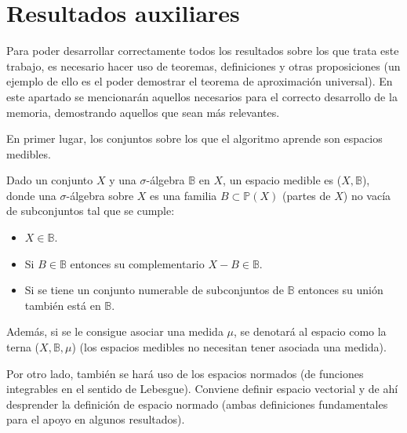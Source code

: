 
\newpage

\section{Resultados auxiliares}

Para poder desarrollar correctamente todos los resultados sobre los que trata este trabajo, es necesario hacer uso de teoremas, definiciones y otras proposiciones (un ejemplo de ello es el poder demostrar el teorema de aproximación universal). En este apartado se mencionarán aquellos necesarios para el correcto desarrollo de la memoria, demostrando aquellos que sean más relevantes.

En primer lugar, los conjuntos sobre los que el algoritmo aprende son espacios medibles.

\begin{definicion}
Dado un conjunto $X$ y una $\sigma$-álgebra $\mathbb{B}$ en $X$, un espacio medible es ($X,\mathbb{B}$), donde una $\sigma$-álgebra sobre $X$ es una familia $B \subset \mathbb{P}(X)$ (partes de $X$) no vacía de subconjuntos tal que se cumple:
\begin{itemize}
	\item $X \in \mathbb{B}$.
	\item Si $B\in\mathbb{B} $ entonces su complementario $X-B \in \mathbb{B}$.
	\item Si se tiene un conjunto numerable de subconjuntos de $\mathbb{B}$ entonces su unión también está en $\mathbb{B}$.
\end{itemize}
Además, si se le consigue asociar una medida $\mu$, se denotará al espacio como la terna ($X,\mathbb{B},\mu$) (los espacios medibles no necesitan tener asociada una medida).
\end{definicion}

Por otro lado, también se hará uso de los espacios normados (de funciones integrables en el sentido de Lebesgue). Conviene definir espacio vectorial y de ahí desprender la definición de espacio normado (ambas definiciones fundamentales para el apoyo en algunos resultados).

